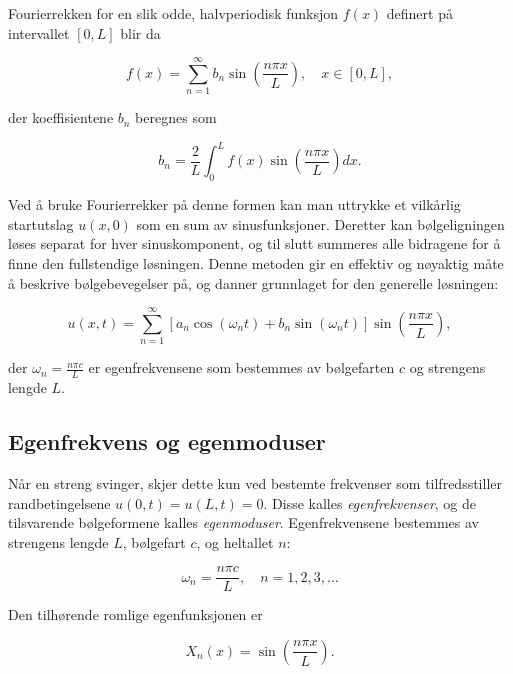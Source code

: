 Fourierrekken for en slik odde, halvperiodisk funksjon $f(x)$ definert på intervallet $[0,L]$ blir da

\begin{equation*}
f(x) = \sum_{n=1}^{\infty} b_n \sin\left(\frac{n\pi x}{L}\right), \quad x \in [0,L],
\end{equation*}

der koeffisientene $b_n$ beregnes som

\begin{equation*}
b_n = \frac{2}{L} \int_{0}^{L} f(x) \sin\left(\frac{n\pi x}{L}\right) dx.
\end{equation*}

Ved å bruke Fourierrekker på denne formen kan man uttrykke et vilkårlig startutslag $u(x,0)$ som en sum av sinusfunksjoner.  
Deretter kan bølgeligningen løses separat for hver sinuskomponent, og til slutt summeres alle bidragene for å finne den fullstendige løsningen.  
Denne metoden gir en effektiv og nøyaktig måte å beskrive bølgebevegelser på, og danner grunnlaget for den generelle løsningen:

\begin{equation*}
u(x,t) = \sum_{n=1}^{\infty} \left[a_n \cos(\omega_n t) + b_n \sin(\omega_n t)\right] \sin\left(\frac{n\pi x}{L}\right),
\end{equation*}

der $\omega_n = \frac{n\pi c}{L}$ er egenfrekvensene som bestemmes av bølgefarten $c$ og strengens lengde $L$.

\subsection{Egenfrekvens og egenmoduser}

Når en streng svinger, skjer dette kun ved bestemte frekvenser som tilfredsstiller randbetingelsene $u(0,t)=u(L,t)=0$.  
Disse kalles \textit{egenfrekvenser}, og de tilsvarende bølgeformene kalles \textit{egenmoduser}.  
Egenfrekvensene bestemmes av strengens lengde $L$, bølgefart $c$, og heltallet $n$:

\begin{equation*}
\omega_n = \frac{n\pi c}{L}, \quad n = 1,2,3,\dots
\end{equation*}

Den tilhørende romlige egenfunksjonen er

\begin{equation*}
X_n(x) = \sin\left(\frac{n\pi x}{L}\right).
\end{equation*}

